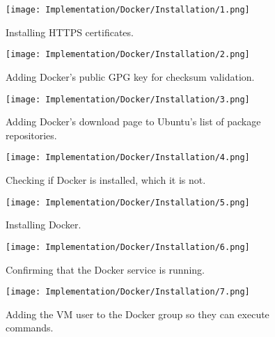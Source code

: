\begin{figure}[H]
    \centering
    \texttt{[image: Implementation/Docker/Installation/1.png]}
    \caption{Installing HTTPS certificates.}
    \label{fig:DockerInstall1}
\end{figure}

\begin{figure}[H]
    \centering
    \texttt{[image: Implementation/Docker/Installation/2.png]}
    \caption{Adding Docker's public GPG key for checksum validation.}
    \label{fig:DockerInstall2}
\end{figure}

\begin{figure}[H]
    \centering
    \texttt{[image: Implementation/Docker/Installation/3.png]}
    \caption{Adding Docker's download page to Ubuntu's list of package repositories.}
    \label{fig:DockerInstall3}
\end{figure}

\begin{figure}[H]
    \centering
    \texttt{[image: Implementation/Docker/Installation/4.png]}
    \caption{Checking if Docker is installed, which it is not.}
    \label{fig:DockerInstall4}
\end{figure}

\begin{figure}[H]
    \centering
    \texttt{[image: Implementation/Docker/Installation/5.png]}
    \caption{Installing Docker.}
    \label{fig:DockerInstall5}
\end{figure}

\begin{figure}[H]
    \centering
    \texttt{[image: Implementation/Docker/Installation/6.png]}
    \caption{Confirming that the Docker service is running.}
    \label{fig:DockerInstall6}
\end{figure}

\begin{figure}[H]
    \centering
    \texttt{[image: Implementation/Docker/Installation/7.png]}
    \caption{Adding the VM user to the Docker group so they can execute commands.}
    \label{fig:DockerInstall7}
\end{figure}